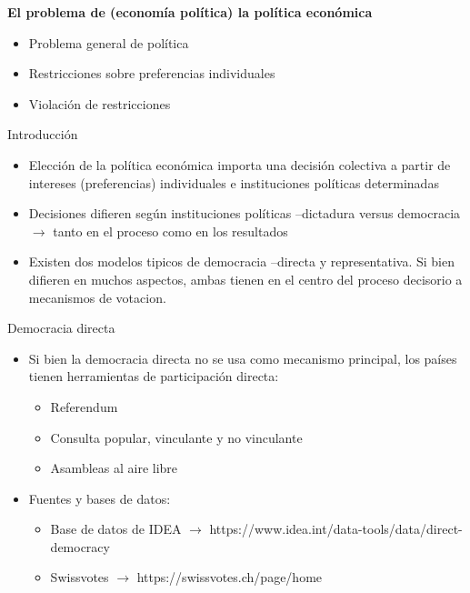 \documentclass[
  ignorenonframetext,
]{beamer}
\providecommand{\tightlist}{%
  \setlength{\itemsep}{0pt}\setlength{\parskip}{0pt}}\usepackage{longtable,booktabs,array}
\begin{document}
\begin{frame}{\textbf{El problema de (economía política) la política
económica}}
\protect\hypertarget{el-problema-de-economuxeda-poluxedtica-la-poluxedtica-econuxf3mica}{}
\begin{itemize}
\tightlist
\item
  Problema general de política
\item
  Restricciones sobre preferencias individuales
\item
  Violación de restricciones
\end{itemize}

\begin{block}{Introducción}
\protect\hypertarget{introducciuxf3n}{}
\begin{itemize}
\tightlist
\item
  Elección de la política económica importa una decisión colectiva a
  partir de intereses (preferencias) individuales e instituciones
  políticas determinadas
\item
  Decisiones difieren según instituciones políticas --dictadura versus
  democracia \(\longrightarrow\) tanto en el proceso como en los
  resultados
\item
  Existen dos modelos tipicos de democracia --directa y representativa.
  Si bien difieren en muchos aspectos, ambas tienen en el centro del
  proceso decisorio a mecanismos de votacion.
\end{itemize}
\end{block}

\begin{block}{Democracia directa}
\protect\hypertarget{democracia-directa}{}
\begin{itemize}
\tightlist
\item
  Si bien la democracia directa no se usa como mecanismo principal, los
  países tienen herramientas de participación directa:

  \begin{itemize}
  \tightlist
  \item
    Referendum
  \item
    Consulta popular, vinculante y no vinculante
  \item
    Asambleas al aire libre
  \end{itemize}
\item
  Fuentes y bases de datos:

  \begin{itemize}
  \tightlist
  \item
    Base de datos de IDEA \(\longrightarrow\)
    https://www.idea.int/data-tools/data/direct-democracy
  \item
    Swissvotes \(\longrightarrow\) https://swissvotes.ch/page/home
  \end{itemize}
\end{itemize}
\end{block}


\end{frame}
\end{document}
